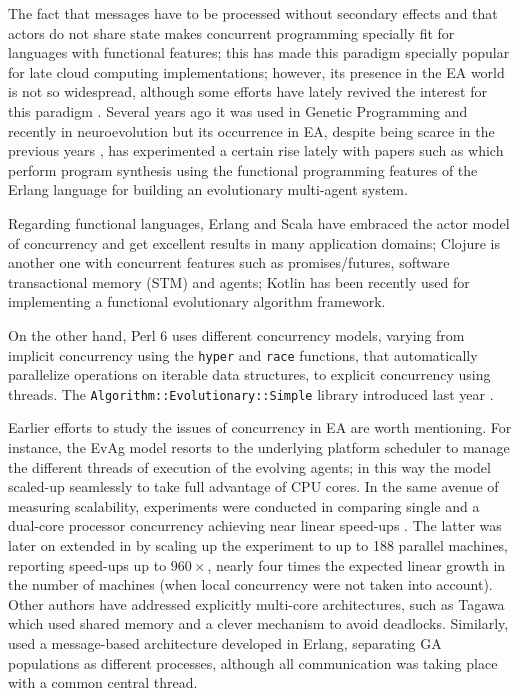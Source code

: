 \documentclass[runningheads]{llncs}\usepackage[]{graphicx}\usepackage[]{color}
\begin{document}
The fact that messages have to be processed without secondary effects
and that actors do not share state makes concurrent
programming specially fit for languages with
functional features; this has made this paradigm specially popular for
late cloud computing implementations; however, its presence in the EA
world is not so widespread, although some efforts have lately revived
the interest for this paradigm \cite{swan2015research}.
Several years ago it was used in Genetic Programming
\cite{Briggs:2008:FGP:1375341.1375345,Huelsbergen:1996:TSE:1595536.1595579,walsh:1999:AFSFESIHLP}
and recently in neuroevolution \cite{Sher2013} but its occurrence in EA,
despite being scarce in the previous years
\cite{Hawkins:2001:GFG:872017.872197}, has experimented a certain rise
lately with papers such as \cite{valkov2018synthesis} which perform
program synthesis using the functional programming features of the Erlang language
\cite{barwell2017using} for building an evolutionary multi-agent system.

Regarding functional languages, Erlang and Scala have
embraced the actor model of concurrency and get excellent results in
many application domains; Clojure is another one with concurrent
features such as promises/futures, software transactional memory (STM) 
and agents; Kotlin \cite{simson2017open} has been recently used for
implementing a functional evolutionary algorithm framework.  

On the
other hand, Perl 6 \cite{Tang:2007:PRI:1190216.1190218,lenzperl} 
uses different concurrency models, varying from implicit concurrency 
using the {\tt hyper} and {\tt race} functions, that automatically 
parallelize operations on iterable data structures, to explicit 
concurrency using threads. 
The {\tt Algorithm::Evolutionary::Simple} library introduced last year
.

Earlier efforts to study the issues of concurrency in EA are worth 
mentioning. For instance, the EvAg model \cite{evag:gpem} resorts to 
the underlying platform scheduler to manage the different threads of 
execution of the evolving agents; in this way the model scaled-up 
seamlessly to take full advantage of CPU cores. In the same avenue 
of measuring scalability,  experiments were conducted
in \cite{wcci:evoag} comparing single and a dual-core processor 
concurrency achieving near linear speed-ups . The latter
was later on extended in \cite{DBLP:conf/evoW/LaredoBMG12} by scaling
up the experiment to up to 188 parallel machines, reporting speed-ups 
up to $960\times$, nearly four times the expected linear growth 
in the number of machines (when local concurrency were not taken 
into account). Other authors have addressed explicitly multi-core 
architectures, such as Tagawa \cite{Tagawa201212} which used 
shared memory and a clever mechanism to avoid deadlocks. Similarly,
\cite{kerdprasop2012concurrent} used a message-based architecture 
developed in Erlang, separating GA populations as different
processes, although all communication was taking place with a common
central thread. 
\end{document}
